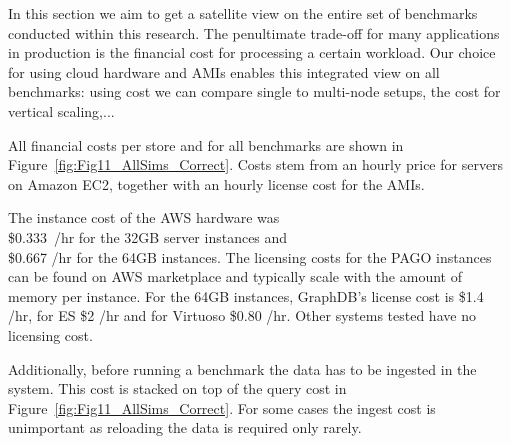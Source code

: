 %

In this section we aim to get a satellite view on the entire set of benchmarks conducted within this research. The penultimate trade-off for many applications in production is the financial cost for processing a certain workload. Our choice for using cloud hardware and AMIs enables this integrated view on all benchmarks: using cost we can compare single to multi-node setups, the cost for vertical scaling,... 

All financial costs per store and for all benchmarks are shown in Figure~\ref{fig:Fig11_AllSims_Correct}. 
Costs stem from an hourly price for servers on Amazon EC2, together with an hourly license cost for the AMIs.

The instance cost of the AWS hardware was \\ \mbox{\$0.333 /hr} for the 32GB server instances and \\\$0.667 /hr for the 64GB instances. The licensing costs for the PAGO instances can be found on AWS marketplace and typically scale with the amount of memory per instance. For the 64GB instances, GraphDB's license cost is \$1.4 /hr, for ES \$2 /hr and for Virtuoso \$0.80 /hr. Other systems tested have no licensing cost.

Additionally, before running a benchmark the data has to be ingested in the system. This cost is stacked on top of the query cost in Figure~\ref{fig:Fig11_AllSims_Correct}. For some cases the ingest cost is unimportant as reloading the data is required only rarely.

